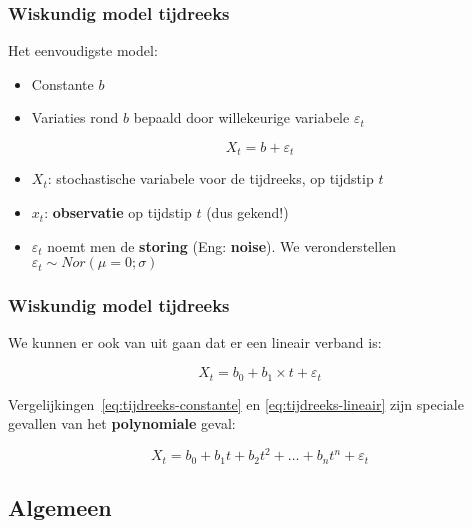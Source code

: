 \documentclass[aspectratio=169]{beamer}
\begin{document}
\begin{frame}
  \frametitle{Wiskundig model tijdreeks}
  
  Het eenvoudigste model:
  
  \begin{itemize}
    \item Constante $b$
    \item Variaties rond $b$ bepaald door willekeurige variabele $\varepsilon_{t}$
  \end{itemize}
  
  \begin{equation}
  X_{t} = b + \varepsilon_{t}
  \label{eq:tijdreeks-constante}
  \end{equation}
  
  \begin{itemize}
    \item $X_{t}$: stochastische variabele voor de tijdreeks, op tijdstip $t$
    \item $x_{t}$: \textbf{observatie} op tijdstip $t$ (dus gekend!)
    \item $\varepsilon_{t}$ noemt men de \textbf{storing} (Eng: \textbf{noise}). We veronderstellen $\varepsilon_{t} \sim Nor(\mu = 0; \sigma)$
  \end{itemize}
\end{frame}

\begin{frame}
  \frametitle{Wiskundig model tijdreeks}
  
  We kunnen er ook van uit gaan dat er een lineair verband is:
  
  \begin{equation}
  X_{t} = b_{0} + b_{1} \times t + \varepsilon_{t}
  \label{eq:tijdreeks-lineair}
  \end{equation}
  
  Vergelijkingen~\ref{eq:tijdreeks-constante} en \ref{eq:tijdreeks-lineair} zijn speciale gevallen van het \textbf{polynomiale} geval:
  
  \begin{equation}
  X_{t} = b_{0} + b_{1} t + b_{2} t^{2} + \dots + b_{n} t^{n} + \varepsilon_{t}
  \label{eq:tijdreeks-polynomiaal}
  \end{equation}
\end{frame}

\subsection{Algemeen}
\end{document}

